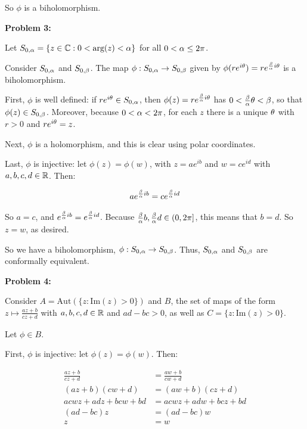 \documentclass[a4paper,12pt]{article}
\begin{document}
So $\phi$ is a biholomorphism. 

\shunt

{\bf Problem 3:}

Let $S_{0,\alpha} = \{z \in \mathbb{C}: 0< \text{arg}(z) < \alpha\}$ for all $0<\alpha \leq 2\pi$. 

Consider $S_{0,\alpha}$ and $S_{0,\beta}$. The map $\phi: S_{0,\alpha} \to S_{0,\beta}$ given by $\phi(re^{i\theta}) = re^{\frac{\beta}{\alpha}i\theta}$ is a biholomorphism.

First, $\phi$ is well defined: if $re^{i\theta} \in S_{0,\alpha}$, then $\phi(z) = re^{\frac{\beta}{\alpha}i\theta}$ has $0<\frac{\beta}{\alpha}\theta <\beta$, so that $\phi(z) \in S_{0,\beta}$. Moreover, because $0<\alpha<2\pi$, for each $z$ there is a unique $\theta$ with $r>0$ and $re^{i\theta}=z$.

Next, $\phi$ is a holomorphism, and this is clear using polar coordinates.

Last, $\phi$ is injective: let $\phi(z) = \phi(w)$, with $z = ae^{ib}$ and $w = ce^{id}$ with $a,b,c,d \in \mathbb{R}$. Then:

\begin{align*}
ae^{\frac{\beta}{\alpha}ib} &=ce^{\frac{\beta}{\alpha}id}\\
\end{align*}

So $a = c$, and $e^{\frac{\beta}{\alpha}ib} = e^{\frac{\beta}{\alpha}id}$. Because $\frac{\beta}{\alpha} b,\frac{\beta}{\alpha}d \in (0,2\pi]$, this means that $b=d$. So $z=w$, as desired.

So we have a biholomorphism, $\phi: S_{0,\alpha} \to S_{0,\beta}$. Thus, $S_{0,\alpha}$ and $ S_{0,\beta}$ are conformally equivalent. 

\shunt

{\bf Problem 4:}

Consider $A=\text{Aut}(\{z:\text{Im}(z) > 0\})$ and $B$, the set of maps of the form $z \mapsto \frac{az+b}{cz+d}$ with $a,b,c,d \in \mathbb{R}$ and $ad-bc >0$, as well as $C = \{z:\text{Im}(z) > 0\}$.

Let $\phi \in B$.

First, $\phi$ is injective: let $\phi(z) = \phi(w)$. Then:

\begin{align*}
\frac{az+b}{cz+d} &= \frac{aw+b}{cw+d}\\
({az+b})({cw+d}) &= ({aw+b})({cz+d})\\
acwz + adz+bcw +bd &= acwz+adw+bcz+bd\\
(ad-bc)z&=(ad-bc)w\\
z&=w
\end{align*}
\end{document}
